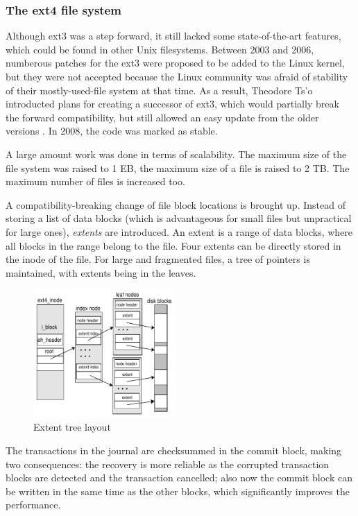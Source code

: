 \documentclass{acm_proc_article-sp}
\begin{document}
\subsubsection{The ext4 file system}

Although ext3 was a step forward, it still lacked some state-of-the-art features, which could be found in other Unix filesystems. Between 2003 and 2006, numberous patches for the ext3 were proposed to be added to the Linux kernel, but they were not accepted because the Linux community was afraid of stability of their mostly-used-file system at that time. As a result, Theodore Ts'o introducted plans for creating a successor of ext3, which would partially break the forward compatibility, but still allowed an easy update from the older versions \cite{newext4}. In 2008, the code was marked as stable.

A large amount work was done in terms of scalability. The maximum size of the file system was raised to 1 EB, the maximum size of a file is raised to 2 TB. The maximum number of files is increased too.

A compatibility-breaking change of file block locations is brought up. Instead of storing a list of data blocks (which is advantageous for small files but unpractical for large ones), {\it extents} are introduced. An extent is a range of data blocks, where all blocks in the range belong to the file. Four extents can be directly stored in the inode of the file. For large and fragmented files, a tree of pointers is maintained, with extents being in the leaves.

\begin{figure}
\centering
\includegraphics[width=0.48\textwidth]{images/extents.pdf}
	\caption{Extent tree layout \cite{newext4}}
\end{figure}

The transactions in the journal are checksummed in the commit block, making two consequences: the recovery is more reliable as the corrupted transaction blocks are detected and the transaction cancelled; also now the commit block can be written in the same time as the other blocks, which significantly improves the performance.
\end{document}
